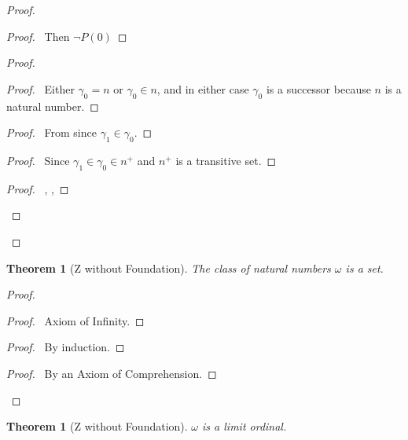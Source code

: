 \documentclass{book}
\let\qed\relax
\newtheorem{thm}[ax]{Theorem}
\theoremstyle{definition}
\begin{document}
\begin{proof}
\pf
{}
\begin{proof}
	\pf\ Then $\neg P(0)$
\end{proof}
\begin{proof}
	\begin{proof}
		\pf\ Either $\gamma_0 = n$ or $\gamma_0 \in n$, and in either case $\gamma_0$ is a successor because $n$ is a natural number.
	\end{proof}
	\begin{proof}
		\pf\ From  since $\gamma_1 \in \gamma_0$.
	\end{proof}
	\begin{proof}
		\pf\ Since $\gamma_1 \in \gamma_0 \in n^+$ and $n^+$ is a transitive set.
	\end{proof}
	\begin{proof}
		\pf\ , , 
	\end{proof}
\end{proof}
\qed
\end{proof}

\begin{thm}[Z without Foundation]
The class of natural numbers $\omega$ is a set.
\end{thm}

\begin{proof}
\pf
{}
\begin{proof}
	\pf\ Axiom of Infinity.
\end{proof}
\begin{proof}
	\pf\ By induction.
\end{proof}
\qedstep
\begin{proof}
	\pf\ By an Axiom of Comprehension.
\end{proof}
\qed
\end{proof}

\begin{thm}[Z without Foundation]
$\omega$ is a limit ordinal.
\end{thm}
\end{document}
